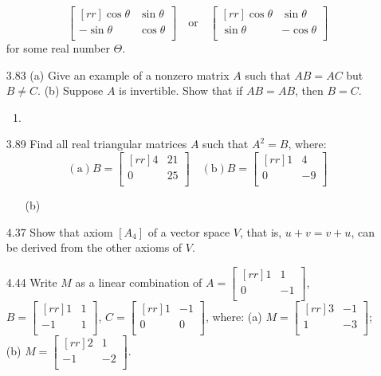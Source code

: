 \documentclass[12pt]{article}
\theoremstyle{definition}
\theoremstyle{plain}
\begin{document}
\begin{enumerate}
\[ \begin{bmatrix}[rr]\cos\theta & \sin\theta\\-\sin\theta & \cos\theta\\\end{bmatrix} \quad \mathrm{or} \quad \begin{bmatrix}[rr]\cos\theta & \sin\theta\\\sin\theta & -\cos\theta \\\end{bmatrix} \]
for some real number $\Theta$.
\item[3.83](a) Give an example of a nonzero matrix $A$ such that $AB=AC$ but $B\neq C$. (b) Suppose $A$ is invertible. Show that if $AB=AB$, then $B=C$.
	\begin{enumerate}
	\item
	\end{enumerate}
\item[3.89]Find all real triangular matrices $A$ such that $A^2=B$, where:
\[ \mathrm{(a)} B=\begin{bmatrix}[rr]4&21\\0&25\\\end{bmatrix} \quad \mathrm{(b)} B = \begin{bmatrix}[rr]1&4\\0&-9\\\end{bmatrix} \]
	\begin{enumerate}
	\item[(b)]
	\end{enumerate}		
\item[4.37]Show that axiom $[A_4]$ of a vector space $V$, that is, $u+v=v+u$, can be derived from the other axioms of $V$.
\item[4.44]Write $M$ as a linear combination of $A=\begin{bmatrix}[rr]1&1\\0&-1\\\end{bmatrix}$, $B=\begin{bmatrix}[rr]1&1\\-1&1\\\end{bmatrix}$, $C=\begin{bmatrix}[rr]1&-1\\0&0\\\end{bmatrix}$, where:
(a) $M=\begin{bmatrix}[rr]3&-1\\1&-3\\\end{bmatrix}$; (b) $M=\begin{bmatrix}[rr]2&1\\-1&-2\\\end{bmatrix}$.

\end{enumerate}
\end{document}
